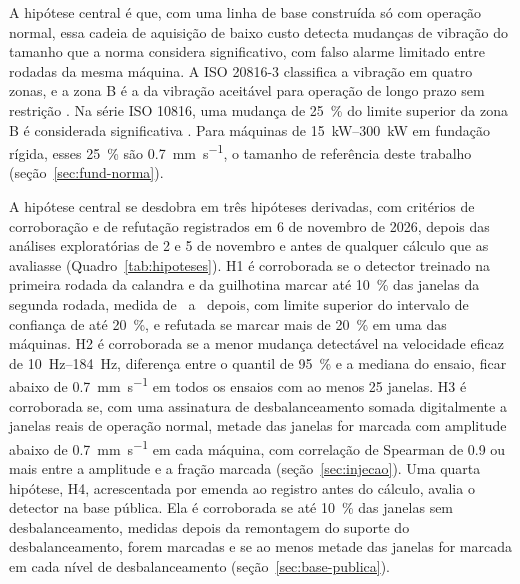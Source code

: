 A hipótese central é que, com uma linha de base construída só com operação normal, essa cadeia de aquisição de baixo custo detecta mudanças de vibração do tamanho que a norma considera significativo, com falso alarme limitado entre rodadas da mesma máquina. A ISO 20816-3 classifica a vibração em quatro zonas, e a zona B é a da vibração aceitável para operação de longo prazo sem restrição \cite{iso208163_2022}. Na série ISO 10816, uma mudança de \SI{25}{\percent} do limite superior da zona B é considerada significativa \cite{schwirzer2002}. Para máquinas de \SIrange{15}{300}{\kilo\watt} em fundação rígida, esses \SI{25}{\percent} são \SI{0,7}{\milli\meter\per\second}, o tamanho de referência deste trabalho (seção~\ref{sec:fund-norma}).

A hipótese central se desdobra em três hipóteses derivadas, com critérios de corroboração e de refutação registrados em 6 de novembro de 2026, depois das análises exploratórias de 2 e 5 de novembro e antes de qualquer cálculo que as avaliasse (Quadro~\ref{tab:hipoteses}). H1 é corroborada se o detector treinado na primeira rodada da calandra e da guilhotina marcar até \SI{10}{\percent} das janelas da segunda rodada, medida de \campoIntervaloCalandra\ a \campoIntervaloGuilhotina\ depois, com limite superior do intervalo de confiança de até \SI{20}{\percent}, e refutada se marcar mais de \SI{20}{\percent} em uma das máquinas. H2 é corroborada se a menor mudança detectável na velocidade eficaz de \SIrange{10}{184}{\hertz}, diferença entre o quantil de \SI{95}{\percent} e a mediana do ensaio, ficar abaixo de \SI{0,7}{\milli\meter\per\second} em todos os ensaios com ao menos \num{25} janelas. H3 é corroborada se, com uma assinatura de desbalanceamento somada digitalmente a janelas reais de operação normal, metade das janelas for marcada com amplitude abaixo de \SI{0,7}{\milli\meter\per\second} em cada máquina, com correlação de Spearman de \num{0,9} ou mais entre a amplitude e a fração marcada (seção~\ref{sec:injecao}). Uma quarta hipótese, H4, acrescentada por emenda ao registro antes do cálculo, avalia o detector na base pública. Ela é corroborada se até \SI{10}{\percent} das janelas sem desbalanceamento, medidas depois da remontagem do suporte do desbalanceamento, forem marcadas e se ao menos metade das janelas for marcada em cada nível de desbalanceamento (seção~\ref{sec:base-publica}).

